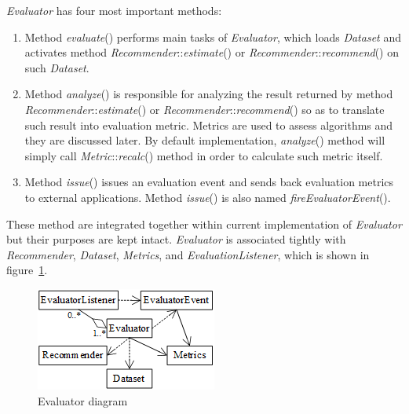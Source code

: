 \documentclass[a4paper,twoside]{article}
\begin{document}
\textit{Evaluator} has four most important methods:
\begin{enumerate}
\item Method \textit{evaluate}() performs main tasks of \textit{Evaluator}, which loads \textit{Dataset} and activates method \textit{Recommender}::\textit{estimate}() or \textit{Recommender}::\textit{recommend}() on such \textit{Dataset}.
\item Method \textit{analyze}() is responsible for analyzing the result returned by method \textit{Recommender}::\textit{estimate}() or \textit{Recommender}::\textit{recommend}() so as to translate such result into evaluation metric. Metrics are used to assess algorithms and they are discussed later. By default implementation, \textit{analyze}() method will simply call \textit{Metric}::\textit{recalc}() method in order to calculate such metric itself.
\item Method \textit{issue}() issues an evaluation event and sends back evaluation metrics to external applications. Method \textit{issue}() is also named \textit{fireEvaluatorEvent}().
\end{enumerate}
These method are integrated together within current implementation of \textit{Evaluator} but their purposes are kept intact. \textit{Evaluator} is associated tightly with \textit{Recommender}, \textit{Dataset}, \textit{Metrics}, and \textit{EvaluationListener}, which is shown in figure~\ref{figure:evaluator-diagram}.
\begin{figure}
\centering
\includegraphics{EvaluatorDiagram.png}
\caption{Evaluator diagram}
\label{figure:evaluator-diagram}
\end{figure}
\end{document}
